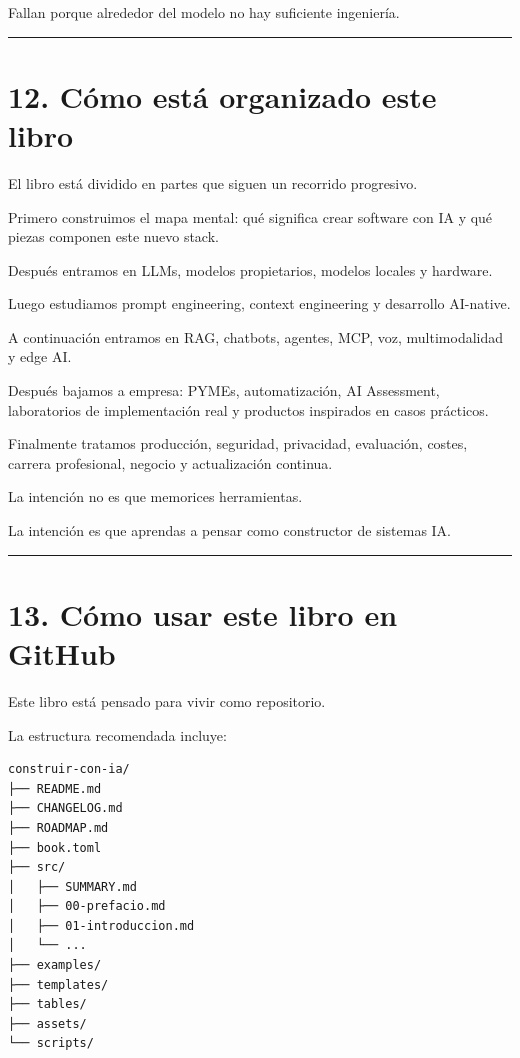 Fallan porque alrededor del modelo no hay suficiente ingeniería.

\begin{center}\rule{0.5\linewidth}{0.5pt}\end{center}

\section{12. Cómo está organizado este
libro}\label{cuxf3mo-estuxe1-organizado-este-libro}

El libro está dividido en partes que siguen un recorrido progresivo.

Primero construimos el mapa mental: qué significa crear software con IA
y qué piezas componen este nuevo stack.

Después entramos en LLMs, modelos propietarios, modelos locales y
hardware.

Luego estudiamos prompt engineering, context engineering y desarrollo
AI-native.

A continuación entramos en RAG, chatbots, agentes, MCP, voz,
multimodalidad y edge AI.

Después bajamos a empresa: PYMEs, automatización, AI Assessment,
laboratorios de implementación real y productos inspirados en casos
prácticos.

Finalmente tratamos producción, seguridad, privacidad, evaluación,
costes, carrera profesional, negocio y actualización continua.

La intención no es que memorices herramientas.

La intención es que aprendas a pensar como constructor de sistemas IA.

\begin{center}\rule{0.5\linewidth}{0.5pt}\end{center}

\section{13. Cómo usar este libro en
GitHub}\label{cuxf3mo-usar-este-libro-en-github}

Este libro está pensado para vivir como repositorio.

La estructura recomendada incluye:

\begin{lstlisting}
construir-con-ia/
├── README.md
├── CHANGELOG.md
├── ROADMAP.md
├── book.toml
├── src/
│   ├── SUMMARY.md
│   ├── 00-prefacio.md
│   ├── 01-introduccion.md
│   └── ...
├── examples/
├── templates/
├── tables/
├── assets/
└── scripts/
\end{lstlisting}

